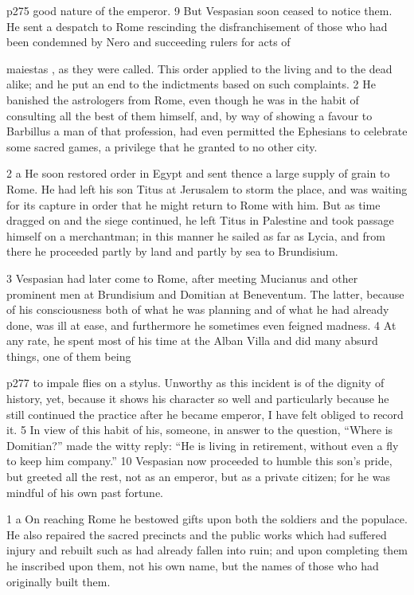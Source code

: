 p275 good nature of the emperor. 9 But Vespasian soon ceased to notice them. He sent a despatch to Rome rescinding the disfranchisement of those who had been condemned by Nero and succeeding rulers for acts of

maiestas , as they were called. This order applied to the living and to the dead alike; and he put an end to the indictments based on such complaints. 2 He banished the astrologers from Rome, even though he was in the habit of consulting all the best of them himself, and, by way of showing a favour to Barbillus a man of that profession, had even permitted the Ephesians to celebrate some sacred games, a privilege that he granted to no other city.

2 a
He soon restored order in Egypt and sent thence a large supply of grain to Rome. He had left his son Titus at Jerusalem to storm the place, and was waiting for its capture in order that he might return to Rome with him. But as time dragged on and the siege continued, he left Titus in Palestine and took passage himself on a merchantman; in this manner he sailed as far as Lycia, and from there he proceeded partly by land and partly by sea to Brundisium.

3
Vespasian had later come to Rome, after meeting Mucianus and other prominent men at Brundisium and Domitian at Beneventum. The latter, because of his consciousness both of what he was planning and of what he had already done, was ill at ease, and furthermore he sometimes even feigned madness. 4 At any rate, he spent most of his time at the Alban Villa and did many absurd things, one of them being

p277 to impale flies on a stylus. Unworthy as this incident is of the dignity of history, yet, because it shows his character so well and particularly because he still continued the practice after he became emperor, I have felt obliged to record it. 5 In view of this habit of his, someone, in answer to the question, ``Where is Domitian?'' made the witty reply: ``He is living in retirement, without even a fly to keep him company.'' 10 Vespasian now proceeded to humble this son's pride, but greeted all the rest, not as an emperor, but as a private citizen; for he was mindful of his own past fortune.

1 a
On reaching Rome he bestowed gifts upon both the soldiers and the populace. He also repaired the sacred precincts and the public works which had suffered injury and rebuilt such as had already fallen into ruin; and upon completing them he inscribed upon them, not his own name, but the names of those who had originally built them.

